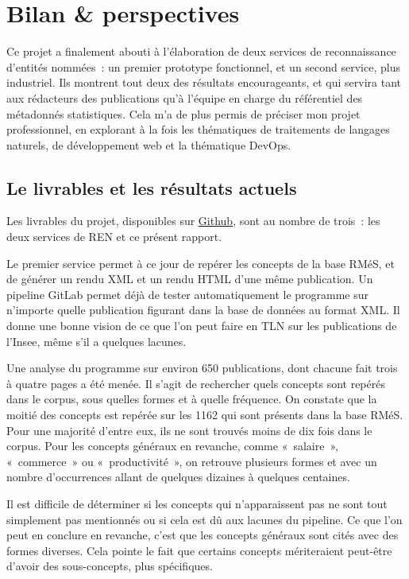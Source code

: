 \section{Bilan \& perspectives}
Ce projet a finalement abouti à l'élaboration de deux services de reconnaissance d'entités nommées~: un premier prototype fonctionnel, et un second service, plus industriel. Ils montrent tout deux des résultats encourageants, et qui servira tant aux rédacteurs des publications qu'à l'équipe en charge du référentiel des métadonnés statistiques. Cela m'a de plus permis de préciser mon projet professionnel, en explorant à la fois les thématiques de traitements de langages naturels, de développement web et la thématique DevOps.

\subsection{Le livrables et les résultats actuels}
Les livrables du projet, disponibles sur \href{https://github.com/Mardelor?tab=repositories}{Github}, sont au nombre de trois~: les deux services de REN et ce présent rapport.
\newline

Le premier service permet à ce jour de repérer les concepts de la base RMéS, et de générer un rendu XML et un rendu HTML d'une même publication. Un pipeline GitLab permet déjà de tester automatiquement le programme sur n'importe quelle publication figurant dans la base de données au format XML. Il donne une bonne vision de ce que l'on peut faire en TLN sur les publications de l'Insee, même s'il a quelques lacunes.
\newline

Une analyse du programme sur environ 650 publications, dont chacune fait trois à quatre pages a été menée. Il s'agit de rechercher quels concepts sont repérés dans le corpus, sous quelles formes et à quelle fréquence. On constate que la moitié des concepts est repérée sur les 1162 qui sont présents dans la base RMéS. Pour une majorité d'entre eux, ils ne sont trouvés moins de dix fois dans le corpus. Pour les concepts généraux en revanche, comme «~salaire~», «~commerce~» ou «~productivité~», on retrouve plusieurs formes et avec un nombre d'occurrences allant de quelques dizaines à quelques centaines.

Il est difficile de déterminer si les concepts qui n'apparaissent pas ne sont tout simplement pas mentionnés ou si cela est dû aux lacunes du pipeline. Ce que l'on peut en conclure en revanche, c'est que les concepts généraux sont cités avec des formes diverses. Cela pointe le fait que certains concepts mériteraient peut-être d'avoir des sous-concepts, plus spécifiques.
\newline

